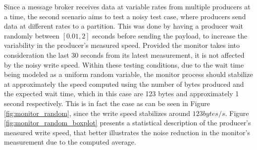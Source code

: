 Since a message broker receives data at variable rates from multiple producers
at a time, the second scenario aims to test a noisy test case, where producers
send data at different rates to a partition. This was done by having a producer
wait randomly between $[0.01, 2]$ seconds before sending the payload, to
increase the variability in the producer's measured speed. Provided the monitor
takes into consideration the last 30 seconds from its latest measurement, it is
not affected by the noisy write speed. Within these testing conditions, due to
the wait time being modeled as a uniform random variable, the monitor process
should stabilize at approximately the speed computed using the number of bytes
produced and the expected wait time, which in this case are 123 bytes and
approximately 1 second respectively. This is in fact the case as can be seen in
Figure \ref{fig:monitor_random}, since the write speed stabilizes around $123
bytes/s$. Figure \ref{fig:monitor_random_boxplot} presents a statistical
description of the producer's measured write speed, that better illustrates the
noise reduction in the monitor's measurement due to the computed average.
